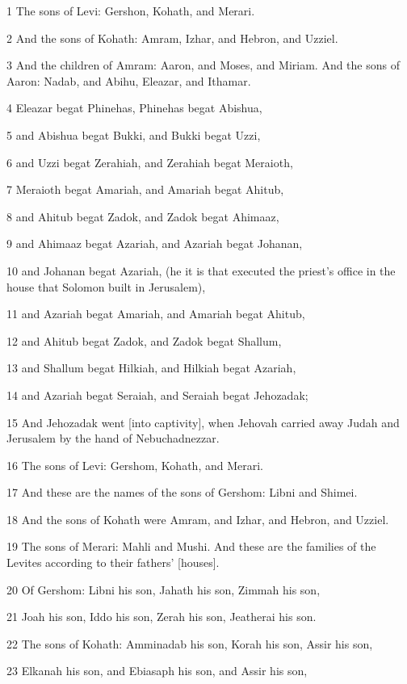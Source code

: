 \par 1 The sons of Levi: Gershon, Kohath, and Merari.
\par 2 And the sons of Kohath: Amram, Izhar, and Hebron, and Uzziel.
\par 3 And the children of Amram: Aaron, and Moses, and Miriam. And the sons of Aaron: Nadab, and Abihu, Eleazar, and Ithamar.
\par 4 Eleazar begat Phinehas, Phinehas begat Abishua,
\par 5 and Abishua begat Bukki, and Bukki begat Uzzi,
\par 6 and Uzzi begat Zerahiah, and Zerahiah begat Meraioth,
\par 7 Meraioth begat Amariah, and Amariah begat Ahitub,
\par 8 and Ahitub begat Zadok, and Zadok begat Ahimaaz,
\par 9 and Ahimaaz begat Azariah, and Azariah begat Johanan,
\par 10 and Johanan begat Azariah, (he it is that executed the priest's office in the house that Solomon built in Jerusalem),
\par 11 and Azariah begat Amariah, and Amariah begat Ahitub,
\par 12 and Ahitub begat Zadok, and Zadok begat Shallum,
\par 13 and Shallum begat Hilkiah, and Hilkiah begat Azariah,
\par 14 and Azariah begat Seraiah, and Seraiah begat Jehozadak;
\par 15 And Jehozadak went [into captivity], when Jehovah carried away Judah and Jerusalem by the hand of Nebuchadnezzar.
\par 16 The sons of Levi: Gershom, Kohath, and Merari.
\par 17 And these are the names of the sons of Gershom: Libni and Shimei.
\par 18 And the sons of Kohath were Amram, and Izhar, and Hebron, and Uzziel.
\par 19 The sons of Merari: Mahli and Mushi. And these are the families of the Levites according to their fathers' [houses].
\par 20 Of Gershom: Libni his son, Jahath his son, Zimmah his son,
\par 21 Joah his son, Iddo his son, Zerah his son, Jeatherai his son.
\par 22 The sons of Kohath: Amminadab his son, Korah his son, Assir his son,
\par 23 Elkanah his son, and Ebiasaph his son, and Assir his son,
